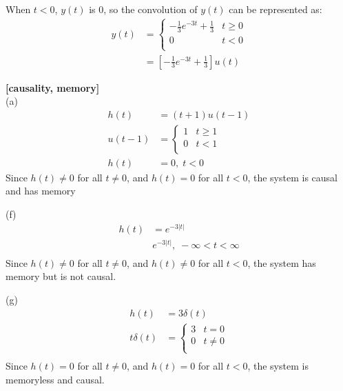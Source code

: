 \documentclass{article}
\begin{document}
When $t < 0$, $y(t)$ is $0$, so the convolution of $y(t)$ can be represented as:
\begin{equation*}
\begin{split}
    y(t)
    &= \begin{cases}
        -\frac{1}{3}e^{-3t} + \frac{1}{3} & t \geq 0\\
        0 & t < 0\\
    \end{cases}\\
    &= [-\frac{1}{3}e^{-3t} + \frac{1}{3}]u(t)
\end{split}
\end{equation*}


 {\bf [causality, memory]}\\
(a)\\
\begin{equation*}
\begin{split}
    h(t) &= (t + 1) u (t - 1)\\
    u(t - 1)
    &= \begin{cases}
        1 & t \geq 1\\
        0 & t < 1\\
    \end{cases}\\
    h(t) &= 0, \; t < 0
\end{split}
\end{equation*}
Since $h(t) \neq 0$ for all $t \neq 0$, and $h(t) = 0$ for all $t < 0$, the system is causal and has memory

\smallskip
(f)\\
\begin{equation*}
\begin{split}
    h(t) &= e^{-3|t|}\\
    & e^{-3|t|}, \; -\infty < t < \infty\\
\end{split}
\end{equation*}
Since $h(t) \neq 0$ for all $t \neq 0$, and $h(t) \neq 0$ for all $t < 0$, the system has memory but is not causal.

\smallskip
(g)\\
\begin{equation*}
\begin{split}
    h (t) &= 3\delta(t)\\
    t\delta(t)
    &= \begin{cases}
        3 & t = 0\\
        0 & t \neq 0\\
    \end{cases}\\
\end{split}
\end{equation*}
Since $h(t) = 0$ for all $t \neq 0$, and $h(t) = 0$ for all $t < 0$, the system is memoryless and causal.
\end{document}
